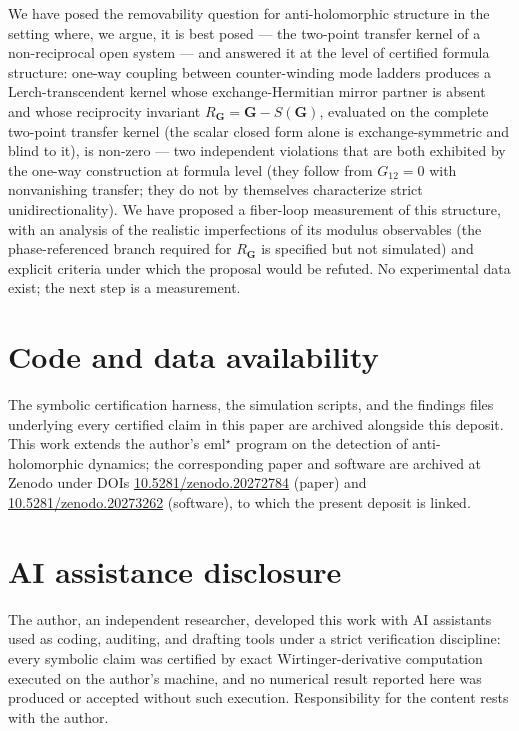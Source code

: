 \documentclass[11pt,a4paper]{article}
\begin{document}
We have posed the removability question for anti-holomorphic structure in the
setting where, we argue, it is best posed --- the two-point transfer kernel of
a non-reciprocal open system --- and answered it at the level of certified
formula structure: one-way coupling between counter-winding mode ladders
produces a Lerch-transcendent kernel whose exchange-Hermitian mirror partner
is absent and whose reciprocity invariant $R_{\mathbf{G}} = \mathbf{G} - S(\mathbf{G})$, evaluated on the
complete two-point transfer kernel (the scalar closed form alone is
exchange-symmetric and blind to it), is non-zero --- two independent
violations that are both exhibited by the one-way construction at formula
level (they follow from $G_{12} = 0$ with nonvanishing transfer; they do not
by themselves characterize strict unidirectionality).
We have proposed a fiber-loop measurement of this structure, with an analysis
of the realistic imperfections of its modulus observables (the
phase-referenced branch required for $R_{\mathbf{G}}$ is specified but not
simulated) and explicit criteria under which the proposal
would be refuted. No experimental data exist; the next step is a measurement.

\section*{Code and data availability}

The symbolic certification harness, the simulation scripts, and the findings
files underlying every certified claim in this paper are archived alongside
this deposit. This work extends the author's eml$^\star$ program on the
detection of anti-holomorphic dynamics; the corresponding paper and software
are archived at Zenodo under DOIs \href{https://doi.org/10.5281/zenodo.20272784}{10.5281/zenodo.20272784}
(paper) and \href{https://doi.org/10.5281/zenodo.20273262}{10.5281/zenodo.20273262}
(software), to which the present deposit is linked.

\section*{AI assistance disclosure}

The author, an independent researcher, developed this work with AI assistants
used as coding, auditing, and drafting tools under a strict verification
discipline: every symbolic claim was certified by exact Wirtinger-derivative
computation executed on the author's machine, and no numerical result reported
here was produced or accepted without such execution. Responsibility for the
content rests with the author.
\end{document}
